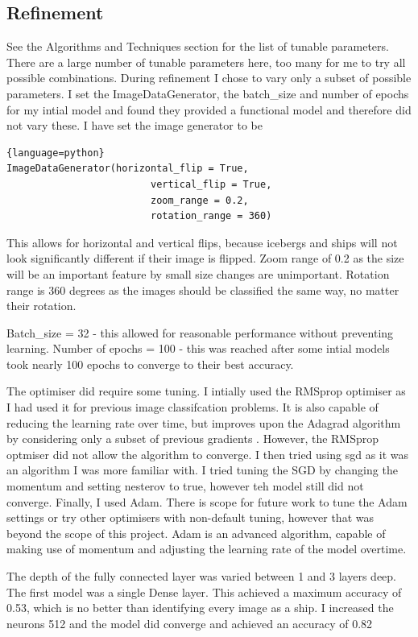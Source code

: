 \documentclass{article}
\begin{document}
\subsection{Refinement}
See the Algorithms and Techniques section for the list of tunable parameters. There are a large number of tunable parameters here, too many for me to try all possible combinations. During refinement I chose to vary only a subset of possible parameters. I set the ImageDataGenerator, the batch_size and number of epochs for my intial model and found they provided a functional model and therefore did not vary these.  
I have set the image generator to be
\begin{lstlisting}{language=python}
ImageDataGenerator(horizontal_flip = True,
                         vertical_flip = True,
                         zoom_range = 0.2,
                         rotation_range = 360)
\end{lstlisting}
This allows for horizontal and vertical flips, because icebergs and ships will not look significantly different if their image is flipped. Zoom range of 0.2 as the size will be an important feature by small size changes are unimportant. Rotation range is 360 degrees as the images should be classified the same way, no matter their rotation. 

Batch_size = 32 - this allowed for reasonable performance without preventing learning. 
Number of epochs = 100 - this was reached after some intial models took nearly 100 epochs to converge to their best accuracy.

The optimiser did require some tuning. I intially used the RMSprop optimiser as I had used it for previous image classifcation problems. It is also capable of reducing the learning rate over time, but improves upon the Adagrad algorithm by considering only a subset of previous gradients \cite{ruder2016overview}. However, the RMSprop optmiser did not allow the algorithm to converge. I then tried using sgd as it was an algorithm I was more familiar with. I tried tuning the SGD by changing the momentum and setting nesterov to true, however teh model still did not converge. Finally, I used Adam. There is scope for future work to tune the Adam settings or try other optimisers with non-default tuning, however that was beyond the scope of this project. Adam is an advanced algorithm, capable of making use of momentum and adjusting the learning rate of the model overtime. \cite{ruder2016overview}

The depth of the fully connected layer was varied between 1 and 3 layers deep. The first model was a single Dense layer. This achieved a maximum accuracy of 0.53, which is no better than identifying every image as a ship. I increased the neurons  512 and the model did converge and achieved an accuracy of 0.82
\end{document}
